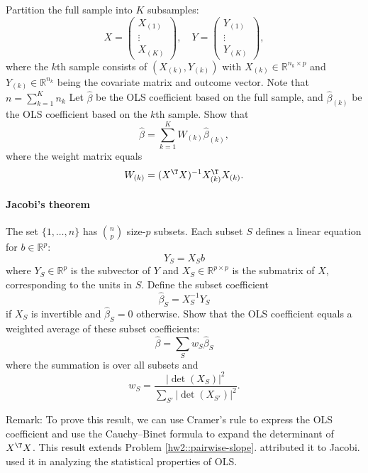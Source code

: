 Partition the full sample into $K$ subsamples:
$$
X=\left(\begin{array}{c}
X_{(1)}\\
\vdots\\
X_{(K)}
\end{array}\right),\quad 
Y=\left(\begin{array}{c}
Y_{(1)}\\
\vdots\\
Y_{(K)}
\end{array}\right),
$$
where the $k$th sample consists of $(X_{(k)}, Y_{(k)})$ with $X_{(k)} \in \mathbb{R}^{n_k\times p}$ and $ Y_{(k)} \in \mathbb{R}^{n_k} $ being the covariate matrix and outcome vector. Note that $n = \sum_{k=1}^K n_k$ Let $\hat{\beta}$ be the OLS coefficient based on the full sample, and $\hat{\beta}_{(k)}$ be the OLS coefficient based on the $k$th sample. Show that 
$$
\hat{\beta} = \sum_{k=1}^{K}W_{(k)}\hat{\beta}_{(k)},
$$
where the weight matrix equals
$$
W_{(k)} =(X^{\T} X)^{-1} X_{(k)}^{\T}X_{(k)} .
$$

 

\paragraph{Jacobi's theorem}\label{hw03::jacobi}


The set $\{1 ,\ldots, n\}$ has $\binom{n}{p}$ size-$p$ subsets. Each subset $S$ defines a linear equation for $b\in \mathbb{R}^p$: 
$$
Y_S = X_S b   
$$
where $Y_S \in \mathbb{R}^{p}$ is the subvector of $Y$ and $X_S \in \mathbb{R}^{p\times p}$ is the submatrix of $X$, corresponding to the units in $S$. Define the subset coefficient 
$$
\hat{\beta}_S = X_S^{-1} Y_S
$$
if $X_S$ is invertible and  $\hat{\beta}_S =  0 $ otherwise. Show that the OLS coefficient equals a weighted average of these subset coefficients: 
$$
\hat{\beta} = \sum_S   w_S  \hat{\beta}_S
$$
where the summation is over all subsets and 
$$
w_S =  \frac{  |  \det(X_S) | ^2  }{  \sum_{S'}  |  \det(X_{S'}) | ^2 } . 
$$

Remark: To prove this result, we can use Cramer's rule to express the OLS coefficient and use the Cauchy--Binet formula to expand the determinant of $X^{\T} X$. 
This result extends Problem \ref{hw2::pairwise-slope}. 
\citet{berman1988theorem} attributed it to Jacobi. 
\citet{wu1986jackknife} used it in analyzing the statistical properties of OLS. 




